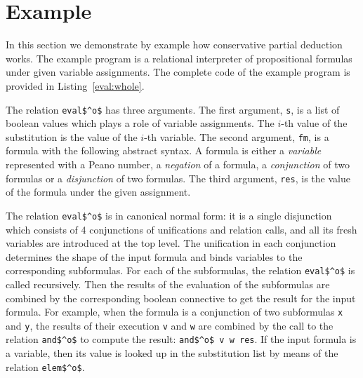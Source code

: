 \section{Example}
\label{example}

In this section we demonstrate by example how conservative partial deduction works.
The example program is a relational interpreter of propositional formulas under given variable assignments.
The complete code of the example program is provided in Listing~\ref{eval:whole}.

The relation \lstinline{eval$^o$} has three arguments.
The first argument, \lstinline{s}, is a list of boolean values which plays a role of variable assignments.
The $i$-th value of the substitution is the value of the $i$-th variable.
The second argument, \lstinline{fm}, is a formula with the following abstract syntax.
A formula is either a \emph{variable} represented with a Peano number, a \emph{negation} of a formula, a \emph{conjunction} of two formulas or a \emph{disjunction} of two formulas.
The third argument, \lstinline{res}, is the value of the formula under the given assignment.

The relation \lstinline{eval$^o$} is in canonical normal form: it is a single disjunction which consists of 4 conjunctions of unifications and relation calls, and all its fresh variables are introduced at the top level.
The unification in each conjunction determines the shape of the input formula and binds variables to the corresponding subformulas.
For each of the subformulas, the relation \lstinline{eval$^o$} is called recursively.
Then the results of the evaluation of the subformulas are combined by the corresponding boolean connective to get the result for the input formula.
For example, when the formula is a conjunction of two subformulas \lstinline{x} and \lstinline{y}, the results of their execution \lstinline{v} and \lstinline{w} are combined by the call to the relation \lstinline{and$^o$} to compute the result: \lstinline{and$^o$ v w res}.
If the input formula is a variable, then its value is looked up in the substitution list by means of the relation \lstinline{elem$^o$}.

